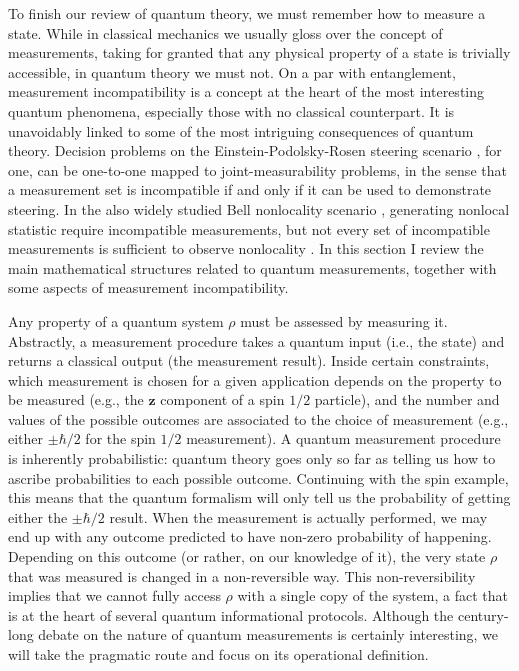 		To finish our review of quantum theory, we must remember how to measure a state. While in classical mechanics we usually gloss over the concept of measurements, taking for granted that any physical property of a state is trivially accessible, in quantum theory we must not. On a par with entanglement, measurement incompatibility is a concept at the heart of the most interesting quantum phenomena, especially those with no classical counterpart. It is unavoidably linked to some of the most intriguing consequences of quantum theory. Decision problems on the Einstein-Podolsky-Rosen steering scenario \cite{uola_2020_steering,cavalcanti_2016_steering}, for one, can be one-to-one mapped to joint-measurability problems, in the sense that a measurement set is incompatible if and only if it can be used to demonstrate steering. In the also widely studied Bell nonlocality scenario \cite{brunner_2014_nonlocality}, generating nonlocal statistic require incompatible measurements, but not every set of incompatible measurements is sufficient to observe nonlocality \cite{quintino_2016_incompatibilitybell,quintino_2018_incompatibilitybellgeneral,bene_2018_incompatibilitybell}. In this section I review the main mathematical structures related to quantum measurements, together with some aspects of measurement incompatibility.
	
		\ornamentbreak

		Any property of a quantum system $\rho$ must be assessed by measuring it. Abstractly, a measurement procedure takes a quantum input (i.e., the state) and returns a classical output (the measurement result). Inside certain constraints, which measurement is chosen for a given application depends on the property to be measured (e.g., the $\mathbf{z}$ component of a spin $1/2$ particle), and the number and values of the possible outcomes are associated to the choice of measurement (e.g., either $\pm \hbar/2$ for the spin $1/2$ measurement). A quantum measurement procedure is inherently probabilistic: quantum theory goes only so far as telling us how to ascribe probabilities to each possible outcome. Continuing with the spin example, this means that the quantum formalism will only tell us the probability of getting either the $\pm \hbar/2$ result. When the measurement is actually performed, we may end up with any outcome predicted to have non-zero probability of happening. Depending on this outcome (or rather, on our knowledge of it), the very state $\rho$ that was measured is changed in a non-reversible way. This non-reversibility implies that we cannot fully access $\rho$ with a single copy of the system, a fact that is at the heart of several quantum informational protocols. Although the century-long debate on the nature of quantum measurements is certainly interesting, we will take the pragmatic route and focus on its operational definition.
		
